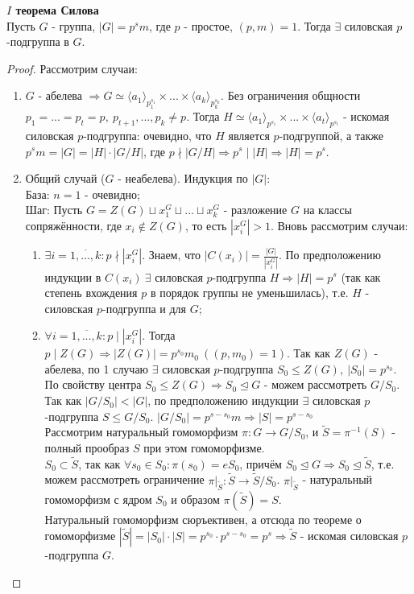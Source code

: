 \textbf{$I$ теорема Силова}\\
    Пусть $G$ - группа, $|G| = p^sm$, где $p$ - простое, $(p, m) = 1$. Тогда $\exists$ силовская $p$-подгруппа в $G$.
\begin{proof}
    Рассмотрим случаи:
    \begin{enumerate}
        \item $G$ - абелева $\Longrightarrow G \simeq \langle a_1 \rangle_{p_1^{s_1}} \times ... \times \langle a_k \rangle_{p_k^{s_k}}$. Без ограничения общности $p_1 = ... = p_t = p,\ p_{t+1},...,p_k \neq p$. Тогда $H \simeq \langle a_1 \rangle_{p^{s_1}} \times ... \times \langle a_t \rangle_{p^{s_t}}$ - искомая силовская $p$-подгруппа: очевидно, что $H$ является $p$-подгруппой, а также $p^sm = |G| = |H|\cdot|G/H|$, где $p \nmid |G/H| \Longrightarrow p^s \mid |H| \Longrightarrow |H| = p^s$.
        \item Общий случай ($G$ - неабелева). Индукция по $|G|$:\\
        База: $n = 1$ - очевидно;\\
        Шаг: Пусть $G = Z(G) \sqcup x_1^G \sqcup ... \sqcup x_k^G$ - разложение $G$ на классы сопряжённости, где $x_i \notin Z(G)$, то есть $|x_i^G| > 1$. Вновь рассмотрим случаи:
        \begin{enumerate}
            \item $\exists i = \overline{1,...,k}: p \nmid |x_i^G|$. Знаем, что $|C(x_i)| = \frac{|G|}{|x_i^G|}$. По предположению индукции в $C(x_i) \ \exists$ силовская $p$-подгруппа $H \Longrightarrow |H| = p^s$ (так как степень вхождения $p$ в порядок группы не уменьшилась), т.е. $H$ - силовская $p$-подгруппа и для $G$;
            \item $\forall i = \overline{1,...,k}: p \mid |x_i^G|$. Тогда $p \mid Z(G) \Longrightarrow |Z(G)| = p^{s_0}m_0 \ ((p, m_0) = 1)$. Так как $Z(G)$ - абелева, по 1 случаю $\exists$ силовская $p$-подгруппа $S_0 \leq Z(G), \ |S_0| = p^{s_0}$.\\
            По свойству центра $S_0 \leq Z(G) \Longrightarrow S_0 \unlhd G$ - можем рассмотреть $G/S_0$.
            Так как $|G/S_0| < |G|$, по предположению индукции $\exists$ силовская $p$-подгруппа $S \leq G/S_0$. $|G/S_0| = p^{s-s_0}m \Longrightarrow |S| = p^{s-s_0}$\\
            Рассмотрим натуральный гомоморфизм $\pi: G \rightarrow G/S_0$, и $\tilde{S} = \pi^{-1}(S)$ - полный прообраз $S$ при этом гомоморфизме.\\
            $S_0 \subset \tilde{S}$, так как $\forall s_0 \in S_0: \pi(s_0) = eS_0$, причём $S_0 \unlhd G \Longrightarrow S_0 \unlhd \tilde{S}$, т.е. можем рассмотреть ограничение $\pi|_{\tilde{S}}: \tilde{S} \rightarrow \tilde{S}/S_0$. $\pi|_{\tilde{S}}$ - натуральный гомоморфизм с ядром $S_0$ и образом $\pi(\tilde{S}) = S$.\\
            Натуральный гомоморфизм сюръективен, а отсюда по теореме о гомоморфизме $|\tilde{S}| = |S_0|\cdot|S| = p^{s_0} \cdot p^{s-s_0} = p^s \Longrightarrow \tilde{S}$ - искомая силовская $p$-подгруппа $G$. 
        \end{enumerate}
    \end{enumerate}
\end{proof}
